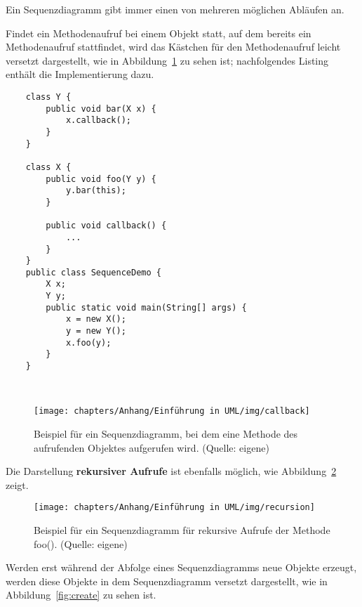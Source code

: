 \begin{tcolorbox}[enlarge top by=0.5cm,enlarge bottom by=0.5cm]
Ein Sequenzdiagramm gibt immer einen von mehreren möglichen Abläufen an.\\
\end{tcolorbox}


\noindent
Findet ein Methodenaufruf bei einem Objekt statt, auf dem bereits ein Methodenaufruf stattfindet, wird das Kästchen für den Methodenaufruf leicht versetzt dargestellt, wie in Abbildung~\ref{fig:callback} zu sehen ist; nachfolgendes Listing enthält die Implementierung dazu.

\begin{verbatim}
    class Y {
        public void bar(X x) {
            x.callback();
        }
    }

    class X {
        public void foo(Y y) {
            y.bar(this);
        }

        public void callback() {
            ...
        }
    }
    public class SequenceDemo {
        X x;
        Y y;
        public static void main(String[] args) {
            x = new X();
            y = new Y();
            x.foo(y);
        }
    }
\end{verbatim}\\

\begin{figure}
    \centering
    \texttt{[image: chapters/Anhang/Einführung in UML/img/callback]}
    \caption{Beispiel für ein Sequenzdiagramm, bei dem eine Methode des aufrufenden Objektes aufgerufen wird. (Quelle: eigene)}
    \label{fig:callback}
\end{figure}

\noindent
Die Darstellung \textbf{rekursiver Aufrufe} ist ebenfalls möglich, wie Abbildung~\ref{fig:recursion} zeigt.

\begin{figure}
    \centering
    \texttt{[image: chapters/Anhang/Einführung in UML/img/recursion]}
    \caption{Beispiel für ein Sequenzdiagramm für rekursive Aufrufe der Methode foo(). (Quelle: eigene)}
    \label{fig:recursion}
\end{figure}


\noindent
Werden erst während der Abfolge eines Sequenzdiagramms neue Objekte erzeugt, werden diese Objekte in dem Sequenzdiagramm versetzt dargestellt, wie in Abbildung~\ref{fig:create} zu sehen ist.

